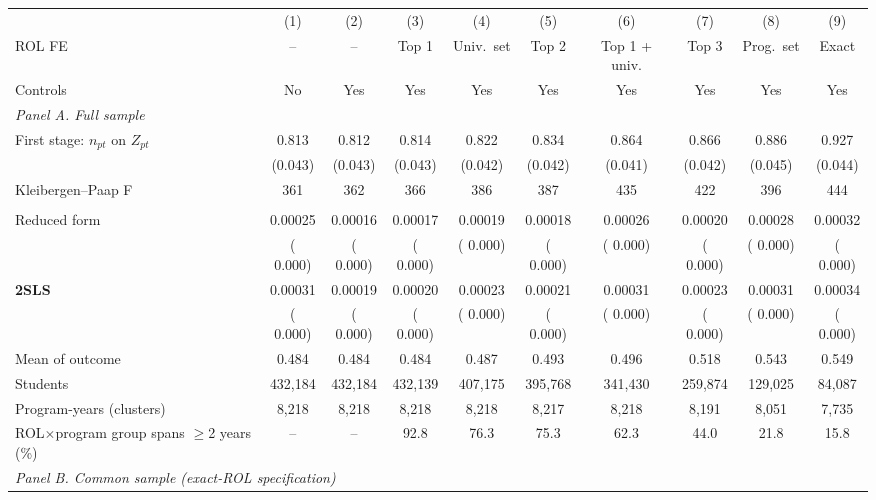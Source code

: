 \begin{tabular}{l*{9}{c}}
\toprule
  & (1) & (2) & (3) & (4) & (5) & (6) & (7) & (8) & (9) \\
ROL FE & -- & -- & Top 1 & Univ.\ set & Top 2 & Top 1 + univ. & Top 3 & Prog.\ set & Exact \\
Controls & No & Yes & Yes & Yes & Yes & Yes & Yes & Yes & Yes \\
\midrule
\multicolumn{10}{l}{\textit{Panel A. Full sample}} \\
First stage: \(n_{pt}\) on \(Z_{pt}\) &  0.813\sym{***} &  0.812\sym{***} &  0.814\sym{***} &  0.822\sym{***} &  0.834\sym{***} &  0.864\sym{***} &  0.866\sym{***} &  0.886\sym{***} &  0.927\sym{***} \\
 & (0.043) & (0.043) & (0.043) & (0.042) & (0.042) & (0.041) & (0.042) & (0.045) & (0.044) \\
Kleibergen--Paap F &    361 &    362 &    366 &    386 &    387 &    435 &    422 &    396 &    444 \\
\addlinespace
\multicolumn{10}{l}{Graduation from any university, 8y} \\
\quad Reduced form &  0.00025\sym{***} &  0.00016\sym{*} &  0.00017\sym{*} &  0.00019\sym{**} &  0.00018\sym{*} &  0.00026\sym{**} &  0.00020\sym{*} &  0.00028\sym{**} &  0.00032\sym{**} \\
 & ( 0.000) & ( 0.000) & ( 0.000) & ( 0.000) & ( 0.000) & ( 0.000) & ( 0.000) & ( 0.000) & ( 0.000) \\
\quad \textbf{2SLS} &  0.00031\sym{***} &  0.00019\sym{*} &  0.00020\sym{**} &  0.00023\sym{**} &  0.00021\sym{*} &  0.00031\sym{**} &  0.00023\sym{*} &  0.00031\sym{**} &  0.00034\sym{**} \\
 & ( 0.000) & ( 0.000) & ( 0.000) & ( 0.000) & ( 0.000) & ( 0.000) & ( 0.000) & ( 0.000) & ( 0.000) \\
Mean of outcome & 0.484 & 0.484 & 0.484 & 0.487 & 0.493 & 0.496 & 0.518 & 0.543 & 0.549 \\
Students &   432,184 &   432,184 &   432,139 &   407,175 &   395,768 &   341,430 &   259,874 &   129,025 &    84,087 \\
Program-years (clusters) &  8,218 &  8,218 &  8,218 &  8,218 &  8,217 &  8,218 &  8,191 &  8,051 &  7,735 \\
ROL\(\times\)program group spans \(\geq\)2 years (\%) & -- & -- &  92.8 &  76.3 &  75.3 &  62.3 &  44.0 &  21.8 &  15.8 \\
\midrule
\multicolumn{10}{l}{\textit{Panel B. Common sample (exact-ROL specification)}} \\

\end{tabular}
